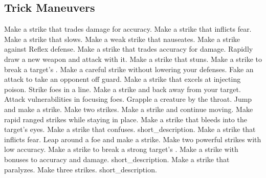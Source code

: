\subsection{Trick Maneuvers}\label{Trick Maneuvers}
\begin{spelllist}
 Make a strike that trades damage for accuracy.
 Make a strike that inflicts fear.
 Make a strike that slows.
 Make a weak strike that nauseates.
 Make a strike against Reflex defense.
 Make a strike that trades accuracy for damage.
 Rapidly draw a new weapon and attack with it.
 Make a strike that stuns.
 Make a strike to break a target's .
 Make a careful strike without lowering your defenses.
 Fake an attack to take an opponent off guard.
 Make a strike that excels at injecting poison.
 Strike foes in a line.
 Make a strike and back away from your target.
 Attack vulnerabilities in focusing foes.
 Grapple a creature by the throat.
 Jump and make a strike.
 Make two strikes.
 Make a strike and continue moving.
 Make rapid ranged strikes while staying in place.
 Make a strike that bleeds into the target's eyes.
 Make a strike that confuses.
 short_description.
 Make a strike that inflicts fear.
 Leap around a foe and make a strike.
 Make two powerful strikes with low accuracy.
 Make a strike to break a strong target's .
 Make a strike with bonuses to accuracy and damage.
 short_description.
 Make a strike that paralyzes.
 Make three strikes.
 short_description.
\end{spelllist}



